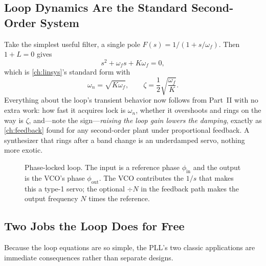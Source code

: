 \subsection{Loop Dynamics Are the Standard Second-Order System}
Take the simplest useful filter, a single pole \(F(s)=1/(1+s/\omega_f)\). Then
\(1+L=0\) gives
\[
s^2+\omega_f s+K\omega_f=0,
\]
which is \cref{ch:linsys}'s standard form with
\[
\omega_n=\sqrt{K\omega_f},
\qquad
\zeta=\frac{1}{2}\sqrt{\frac{\omega_f}{K}} .
\]
Everything about the loop's transient behavior now follows from Part~II with no extra
work: how fast it acquires lock is \(\omega_n\), whether it overshoots and rings on the
way is \(\zeta\), and---note the sign---\emph{raising the loop gain lowers the
damping}, exactly as \cref{ch:feedback} found for any second-order plant under
proportional feedback. A synthesizer that rings after a band change is an underdamped
servo, nothing more exotic.

\begin{figure}[htbp]
\centering
{}
\caption{Phase-locked loop. The input is a reference phase
\(\phi_{\mathrm{in}}\) and the output is the VCO's phase \(\phi_{\mathrm{out}}\). The
VCO contributes the \(1/s\) that makes this a type-1 servo; the optional \(\div N\) in
the feedback path makes the output frequency \(N\) times the reference.}
\label{fig:pll}
\end{figure}

\subsection{Two Jobs the Loop Does for Free}
Because the loop equations are so simple, the PLL's two classic applications are
immediate consequences rather than separate designs.

